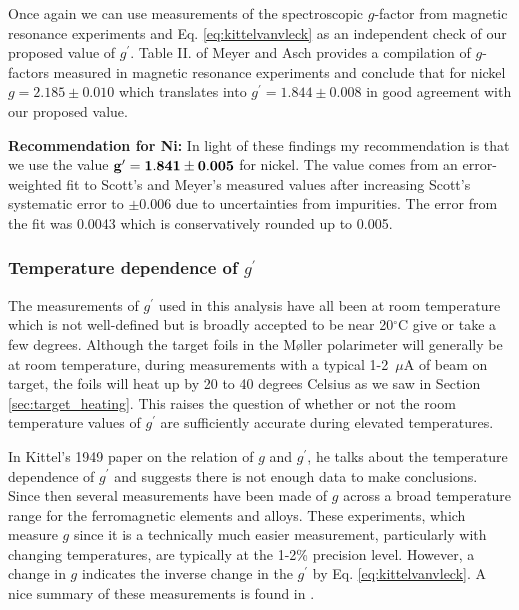 \documentclass[12pt]{article}
\begin{document}
Once again we can use measurements of the spectroscopic $g$-factor from magnetic resonance experiments and Eq. \ref{eq:kittelvanvleck} as an independent check of our proposed value of $g^{\prime}$. Table II. of Meyer and Asch \cite{Meyer1961} provides a compilation of $g$-factors measured in magnetic resonance experiments and conclude that for nickel $g=2.185\pm0.010$ which translates into $g^{\prime}=1.844\pm0.008$ in good agreement with our proposed value.

{\bf Recommendation for Ni:} In light of these findings my recommendation is that we use the value { $\bf g^{\prime}=1.841\pm0.005$} for nickel. The value comes from an error-weighted fit to Scott's and Meyer's measured values after increasing Scott's systematic error to $\pm0.006$ due to uncertainties from impurities. The error from the fit was 0.0043 which is conservatively rounded up to 0.005.

\subsubsection{Temperature dependence of $g^{\prime}$}
The measurements of $g^{\prime}$ used in this analysis have all been at room temperature which is not well-defined but is broadly accepted to be near 20$^{\circ}$C give or take a few degrees. Although the target foils in the M\o ller polarimeter will generally be at room temperature, during measurements with a typical 1-2~$\mu$A of beam on target, the foils will heat up by 20 to 40 degrees Celsius as we saw in Section \ref{sec:target_heating}. This raises the question of whether or not the room temperature values of $g^{\prime}$ are sufficiently accurate during elevated temperatures.

In Kittel's 1949 paper on the relation of $g$ and $g^{\prime}$, he talks about the temperature dependence of $g^{\prime}$ and suggests there is not enough data to make conclusions\cite{Kittel1949}. Since then several measurements have been made of $g$ across a broad temperature range for the ferromagnetic elements and alloys. These experiments, which measure $g$ since it is a technically much easier measurement, particularly with changing temperatures, are typically at the 1-2\% precision level. However, a change in $g$ indicates the inverse change in the  $g^{\prime}$ by Eq. \ref{eq:kittelvanvleck}. A nice summary of these measurements is found in \cite{borovik1988}.
\end{document}
